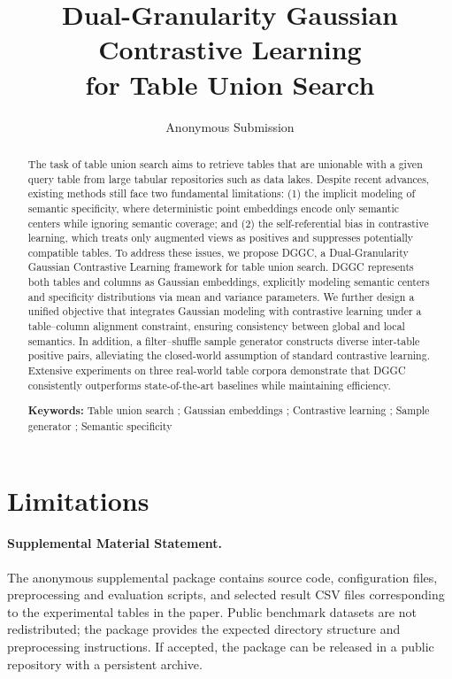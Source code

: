 \documentclass[11pt]{article}
\title{Dual-Granularity Gaussian Contrastive Learning \\for Table Union Search}
\author{Anonymous Submission}
\newcommand{\keywords}[1]{\par\noindent\textbf{Keywords:} {\def\and{; }#1}}
\begin{document}
\maketitle

\begin{abstract}
The task of table union search aims to retrieve tables that are unionable with a given query table from large tabular repositories such as data lakes. Despite recent advances, existing methods still face two fundamental limitations: 
(1) the implicit modeling of semantic specificity, where deterministic point embeddings encode only semantic centers while ignoring semantic coverage; and (2) the self-referential bias in contrastive learning, which treats only augmented views as positives and suppresses potentially compatible tables.
To address these issues, we propose DGGC, a Dual-Granularity Gaussian Contrastive Learning framework for table union search. DGGC represents both tables and columns as Gaussian embeddings, explicitly modeling semantic centers and specificity distributions via mean and variance parameters. We further design a unified objective that integrates Gaussian modeling with contrastive learning under a table–column alignment constraint, ensuring consistency between global and local semantics. In addition, a filter–shuffle sample generator constructs diverse inter-table positive pairs, alleviating the closed-world assumption of standard contrastive learning. Extensive experiments on three real-world table corpora demonstrate that DGGC consistently outperforms state-of-the-art baselines while maintaining efficiency.

\keywords{Table union search \and Gaussian embeddings \and Contrastive learning \and Sample generator \and Semantic specificity}
\end{abstract}







\section{Limitations}


\paragraph*{Supplemental Material Statement.}
The anonymous supplemental package contains source code, configuration files,
preprocessing and evaluation scripts, and selected result CSV files corresponding
to the experimental tables in the paper. Public benchmark datasets are not
redistributed; the package provides the expected directory structure and
preprocessing instructions. If accepted, the package can be released in a public repository with a persistent archive.



\appendix

\end{document}
